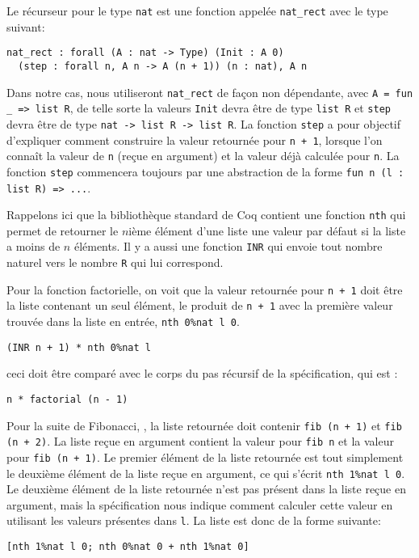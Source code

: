 \documentclass[draft]{jflart}
\begin{document}
Le récurseur pour le type \texttt{nat} est une fonction appelée
\texttt{nat\_rect} avec le type suivant:
\begin{verbatim}
nat_rect : forall (A : nat -> Type) (Init : A 0)
  (step : forall n, A n -> A (n + 1)) (n : nat), A n
\end{verbatim}
Dans notre cas, nous utiliseront \texttt{nat\_rect} de façon non
dépendante, avec \texttt{A = fun \_ => list R}, de telle sorte la
valeurs \texttt{Init} devra être de type \texttt{list R} et \texttt{step} devra
être de type \texttt{nat -> list R -> list R}.  La fonction \texttt{step} a
pour objectif d'expliquer comment construire la valeur retournée pour
\texttt{n + 1}, lorsque l'on connaît la valeur de \texttt{n} (reçue en argument)
et la valeur déjà calculée pour \texttt{n}.  La fonction \texttt{step} commencera
toujours par une abstraction de la forme \texttt{fun n (l : list R) => ...}.

Rappelons ici que la bibliothèque standard de Coq contient une
fonction \texttt{nth} qui permet de retourner le \(n\)ième élément d'une
liste une valeur par défaut si la liste a moins de \(n\) éléments.  Il
y a aussi une fonction \texttt{INR} qui envoie tout nombre naturel vers
le nombre \texttt{R} qui lui correspond.

Pour la fonction factorielle, on voit que la valeur retournée pour
\texttt{n + 1} doit être la liste contenant un seul élément,
le produit de \texttt{n + 1} avec
la première valeur trouvée dans la liste en entrée, \texttt{nth 0\%nat l 0}.
\begin{verbatim}
(INR n + 1) * nth 0%nat l
\end{verbatim}
ceci doit être comparé avec le corps du pas récursif de la
spécification, qui est :
\begin{verbatim}
n * factorial (n - 1)
\end{verbatim}

Pour la suite de Fibonacci, , la liste retournée doit
contenir \texttt{fib (n + 1)} et \texttt{fib (n + 2)}.
La liste reçue en argument contient la valeur pour \texttt{fib
    n} et la valeur pour \texttt{fib (n + 1)}.  Le premier
élément de la liste retournée est tout simplement le deuxième élément
de la liste reçue en argument, ce qui s'écrit \texttt{nth 1\%nat l 0}.
Le deuxième élément de la liste retournée n'est pas présent dans la
liste reçue en argument, mais la spécification nous indique comment
calculer cette valeur en utilisant les valeurs présentes dans \texttt{l}.
La liste est donc de la forme suivante:
\begin{verbatim}
[nth 1%nat l 0; nth 0%nat 0 + nth 1%nat 0]
\end{verbatim}
\end{document}

